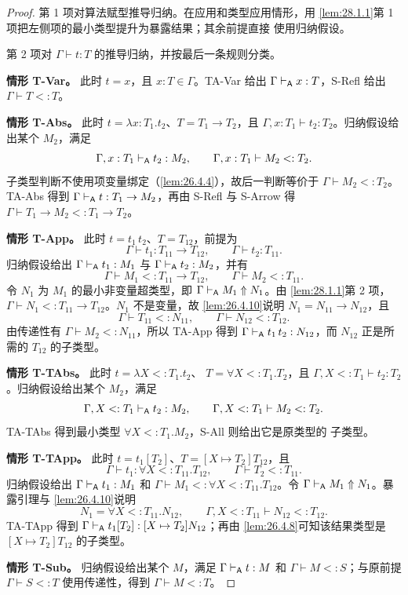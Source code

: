 \begin{proof}
第 1 项对算法赋型推导归纳。在应用和类型应用情形，用
\cref{lem:28.1.1}第 1 项把左侧项的最小类型提升为暴露结果；其余前提直接
使用归纳假设。

第 2 项对 \(\Gamma\vdash t:T\) 的推导归纳，并按最后一条规则分类。

\textbf{情形 T-Var。}
此时 \(t=x\)，且 \(x:T\in\Gamma\)。TA-Var 给出
\(\Gamma\mathrel{\vdash_{\mathsf A}} x:T\)，S-Refl 给出 \(\Gamma\vdash T<:T\)。

\textbf{情形 T-Abs。}
此时 \(t=\lambda x:T_1.t_2\)、\(T=T_1\to T_2\)，且
\(\Gamma,x:T_1\vdash t_2:T_2\)。归纳假设给出某个 \(M_2\)，满足
\[
\Gamma,x:T_1\mathrel{\vdash_{\mathsf A}} t_2:M_2,
\qquad
\Gamma,x:T_1\vdash M_2<:T_2.
\]
子类型判断不使用项变量绑定（\cref{lem:26.4.4}），故后一判断等价于
\(\Gamma\vdash M_2<:T_2\)。TA-Abs 得到
\(\Gamma\mathrel{\vdash_{\mathsf A}} t:T_1\to M_2\)，再由 S-Refl 与 S-Arrow 得
\(\Gamma\vdash T_1\to M_2<:T_1\to T_2\)。

\textbf{情形 T-App。}
此时 \(t=t_1\,t_2\)、\(T=T_{12}\)，前提为
\[
\Gamma\vdash t_1:T_{11}\to T_{12},
\qquad
\Gamma\vdash t_2:T_{11}.
\]
归纳假设给出
\(\Gamma\mathrel{\vdash_{\mathsf A}} t_1:M_1\) 与
\(\Gamma\mathrel{\vdash_{\mathsf A}} t_2:M_2\)，并有
\[
\Gamma\vdash M_1<:T_{11}\to T_{12},
\qquad
\Gamma\vdash M_2<:T_{11}.
\]
令 \(N_1\) 为 \(M_1\) 的最小非变量超类型，即
\(\Gamma\mathrel{\vdash_{\mathsf A}} M_1\Uparrow N_1\)。由
\cref{lem:28.1.1}第 2 项，
\(\Gamma\vdash N_1<:T_{11}\to T_{12}\)。\(N_1\) 不是变量，故
\cref{lem:26.4.10}说明
\(N_1=N_{11}\to N_{12}\)，且
\[
\Gamma\vdash T_{11}<:N_{11},
\qquad
\Gamma\vdash N_{12}<:T_{12}.
\]
由传递性有 \(\Gamma\vdash M_2<:N_{11}\)，所以 TA-App 得到
\(\Gamma\mathrel{\vdash_{\mathsf A}} t_1\,t_2:N_{12}\)，而 \(N_{12}\) 正是所需的
\(T_{12}\) 的子类型。

\textbf{情形 T-TAbs。}
此时 \(t=\lambda X<:T_1.t_2\)、
\(T=\forall X<:T_1.T_2\)，且
\(\Gamma,X<:T_1\vdash t_2:T_2\)。归纳假设给出某个 \(M_2\)，满足
\[
\Gamma,X<:T_1\mathrel{\vdash_{\mathsf A}} t_2:M_2,
\qquad
\Gamma,X<:T_1\vdash M_2<:T_2.
\]
TA-TAbs 得到最小类型 \(\forall X<:T_1.M_2\)，S-All 则给出它是原类型的
子类型。

\textbf{情形 T-TApp。}
此时 \(t=t_1[T_2]\)、\(T=[X\mapsto T_2]T_{12}\)，且
\[
\Gamma\vdash t_1:\forall X<:T_{11}.T_{12},
\qquad
\Gamma\vdash T_2<:T_{11}.
\]
归纳假设给出 \(\Gamma\mathrel{\vdash_{\mathsf A}} t_1:M_1\) 和
\(\Gamma\vdash M_1<:\forall X<:T_{11}.T_{12}\)。令
\(\Gamma\mathrel{\vdash_{\mathsf A}} M_1\Uparrow N_1\)。暴露引理与
\cref{lem:26.4.10}说明
\[
N_1=\forall X<:T_{11}.N_{12},
\qquad
\Gamma,X<:T_{11}\vdash N_{12}<:T_{12}.
\]
TA-TApp 得到
\(\Gamma\mathrel{\vdash_{\mathsf A}} t_1[T_2]:[X\mapsto T_2]N_{12}\)；再由
\cref{lem:26.4.8}可知该结果类型是
\([X\mapsto T_2]T_{12}\) 的子类型。

\textbf{情形 T-Sub。}
归纳假设给出某个 \(M\)，满足
\(\Gamma\mathrel{\vdash_{\mathsf A}} t:M\) 和 \(\Gamma\vdash M<:S\)；与原前提
\(\Gamma\vdash S<:T\) 使用传递性，得到 \(\Gamma\vdash M<:T\)。
\end{proof}

